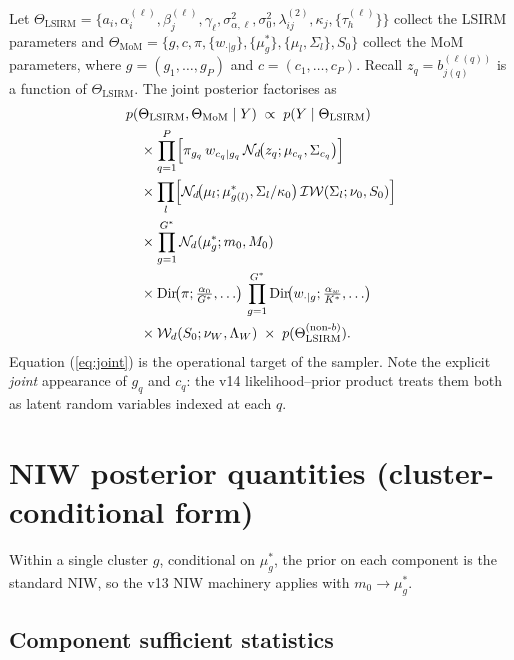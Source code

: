 \documentclass[11pt]{article}
\newcommand{\Dir}{\mathrm{Dir}}
\newcommand{\IW}{\mathcal{IW}}
\begin{document}
Let $\Theta_{\text{LSIRM}}=\{a_i,\alpha_i^{(\ell)},\beta_j^{(\ell)},
\gamma_\ell,\sigma_{\alpha,\ell}^2,\sigma_0^2,\lambda_{ij}^{(2)},
\kappa_j,\{\tau_h^{(\ell)}\}\}$ collect the LSIRM parameters and
$\Theta_{\text{MoM}}=\{g,c,\pi,\{w_{\cdot|g}\},\{\mu_g^*\},
\{\mu_l,\Sigma_l\},S_0\}$ collect the MoM parameters, where
$g=(g_1,\ldots,g_P)$ and $c=(c_1,\ldots,c_P)$.
Recall $z_q=b_{j(q)}^{(\ell(q))}$ is a function of $\Theta_{\text{LSIRM}}$.
The joint posterior factorises as
\begin{equation}
\begin{aligned}
&p(\Theta_{\text{LSIRM}},\Theta_{\text{MoM}}\mid Y) \;\propto\;
   p(Y\mid\Theta_{\text{LSIRM}})\\
&\quad\times \prod_{q=1}^{P}\Bigl[\pi_{g_q}\,w_{c_q\mid g_q}\,
   \mathcal{N}_d\!\bigl(z_q;\mu_{c_q},\Sigma_{c_q}\bigr)\Bigr]\\
&\quad\times \prod_{l}\Bigl[\mathcal{N}_d\!\bigl(\mu_l;\mu_{g(l)}^*,\Sigma_l/\kappa_0\bigr)\,
                          \IW(\Sigma_l;\nu_0,S_0)\Bigr]\\
&\quad\times \prod_{g=1}^{G^*}\mathcal{N}_d(\mu_g^*;m_0,M_0)\\
&\quad\times \Dir\!\bigl(\pi;\tfrac{\alpha_0}{G^*},\ldots\bigr)\,
             \prod_{g=1}^{G^*}\Dir\!\bigl(w_{\cdot|g};\tfrac{\alpha_w}{K^*},\ldots\bigr)\\
&\quad\times \mathcal{W}_d(S_0;\nu_W,\Lambda_W)\;\times\;p(\Theta_{\text{LSIRM}}^{(\text{non-}b)}).
\end{aligned}
\label{eq:joint}
\end{equation}
Equation (\ref{eq:joint}) is the operational target of the sampler. Note
the explicit \emph{joint} appearance of $g_q$ and $c_q$: the v14
likelihood--prior product treats them both as latent random variables
indexed at each $q$.

\section{NIW posterior quantities (cluster-conditional form)}
\label{sec:niw}

Within a single cluster $g$, conditional on $\mu_g^*$, the prior on each
component is the standard NIW, so the v13 NIW machinery applies with
$m_0\rightarrow\mu_g^*$.

\subsection{Component sufficient statistics}
\end{document}
